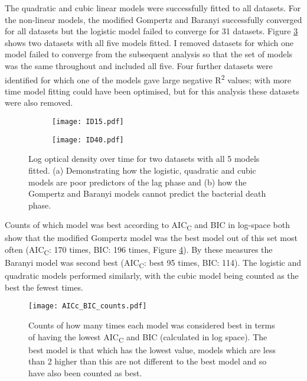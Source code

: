 \documentclass[11pt]{article}
\begin{document}
\begin{linenumbers}
        The quadratic and cubic linear models were successfully fitted to all datasets. For the non-linear models, the modified Gompertz and Baranyi successfully converged for all datasets but the logistic model failed to converge for 31 datasets. Figure \ref{fig:both growth plots} shows two datasets with all five models fitted. I removed datasets for which one model failed to converge from the subsequent analysis so that the set of models was the same throughout and included all five. Four further datasets were identified for which one of the models gave large negative R\textsuperscript{2} values; with more time model fitting could have been optimised, but for this analysis these datasets were also removed. 
        
        \begin{figure}
            \centering
            \begin{subfigure}[a]{0.45\textwidth}
                \centering
                \texttt{[image: ID15.pdf]}
                \caption{}
                \label{fig: growth plot lag}
            \end{subfigure}
            \hfill
            \begin{subfigure}[a]{0.45\textwidth}
                \centering
                \texttt{[image: ID40.pdf]}
                \caption{}
                \label{fig:growth plot death}
            \end{subfigure}
            \caption{Log optical density over time for two datasets with all 5 models fitted. (a) Demonstrating how the logistic, quadratic and cubic models are poor predictors of the lag phase and (b) how the Gompertz and Baranyi models cannot predict the bacterial death phase.}
            \label{fig:both growth plots}
        \end{figure}
        
        Counts of which model was best according to AIC\textsubscript{C} and BIC in log-space both show that the modified Gompertz model was the best model out of this set most often (AIC\textsubscript{C}: 170 times, BIC: 196 times, Figure \ref{fig: counts in log space}). By these measures the Baranyi model was second best (AIC\textsubscript{C}: best 95 times, BIC: 114). The logistic and quadratic models performed similarly, with the cubic model being counted as the best the fewest times.
    
        \begin{figure}[ht!]
            \centering
            \texttt{[image: AICc\_BIC\_counts.pdf]}
            \caption{Counts of how many times each model was considered best in terms of having the lowest AIC\textsubscript{C} and BIC (calculated in log space). The best model is that which has the lowest value, models which are less than 2 higher than this are not different to the best model and so have also been counted as best.}
            \label{fig: counts in log space}
        \end{figure}
        

\end{linenumbers}
\end{document}
